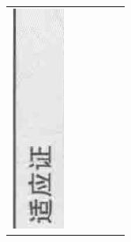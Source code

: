 \documentclass[10pt]{article}
\begin{document}
\begin{center}
\begin{tabular}{|c|c|c|c|c|c|}
 \\
\hline
\includegraphics[max width=\textwidth]{2024_07_05_645bb794a4d4f32ee0c8g-352(12)}

\end{tabular}
\end{center}
\end{document}

